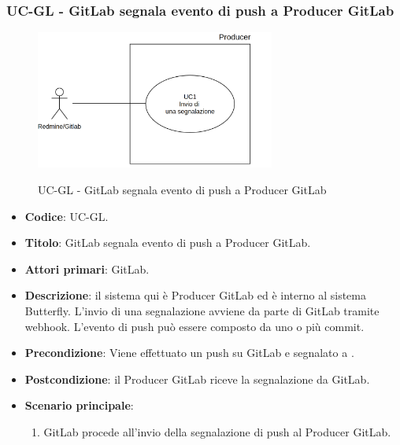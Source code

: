 \subsubsection{UC\theuccount-GL - GitLab segnala evento di push a Producer GitLab}
	\begin{figure}[H]
		\centering
		\includegraphics[width=0.7\textwidth]{img/UC1.png}\\
		\caption{UC\theuccount-GL - GitLab segnala evento di push a Producer GitLab}
	\end{figure}
	\begin{itemize}
		\item \textbf{Codice}: UC\theuccount-GL.
		\item \textbf{Titolo}: GitLab segnala evento di push a Producer GitLab.
		\item \textbf{Attori primari}: GitLab.
		\item \textbf{Descrizione}: il sistema qui è Producer GitLab ed è interno al sistema Butterfly. L'invio di
		una segnalazione avviene da parte di GitLab tramite webhook. L'evento di
		push può essere composto da uno o più commit.
		\item \textbf{Precondizione}: Viene effettuato un push su GitLab e segnalato a \progetto.
		\item \textbf{Postcondizione}: il Producer GitLab riceve la segnalazione da GitLab.
		\item \textbf{Scenario principale}: 
		\begin{enumerate}
			\item GitLab procede all'invio della segnalazione di push al Producer GitLab.
		\end{enumerate}
		
	\end{itemize}